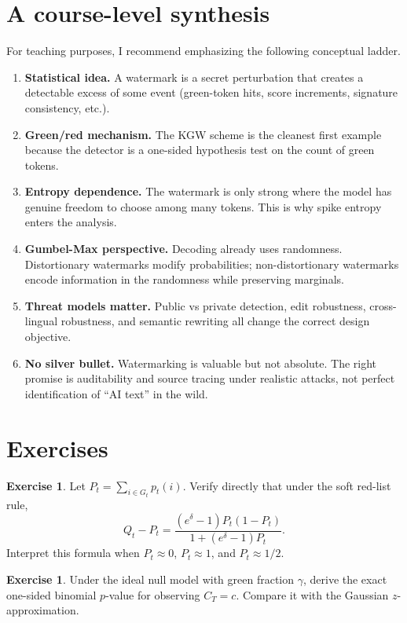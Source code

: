 \documentclass[11pt]{article}
\theoremstyle{definition}
\newtheorem{exercise}[theorem]{Exercise}
\newcommand{\1}{\mathbf{1}}
\begin{document}
\section{A course-level synthesis}

For teaching purposes, I recommend emphasizing the following conceptual ladder.

\begin{enumerate}
    \item \textbf{Statistical idea.} A watermark is a secret perturbation that creates a detectable excess of some event (green-token hits, score increments, signature consistency, etc.).
    \item \textbf{Green/red mechanism.} The KGW scheme is the cleanest first example because the detector is a one-sided hypothesis test on the count of green tokens.
    \item \textbf{Entropy dependence.} The watermark is only strong where the model has genuine freedom to choose among many tokens. This is why spike entropy enters the analysis.
    \item \textbf{Gumbel-Max perspective.} Decoding already uses randomness. Distortionary watermarks modify probabilities; non-distortionary watermarks encode information in the randomness while preserving marginals.
    \item \textbf{Threat models matter.} Public vs private detection, edit robustness, cross-lingual robustness, and semantic rewriting all change the correct design objective.
    \item \textbf{No silver bullet.} Watermarking is valuable but not absolute. The right promise is auditability and source tracing under realistic attacks, not perfect identification of ``AI text'' in the wild.
\end{enumerate}

\section{Exercises}

\begin{exercise}
Let $P_t=\sum_{i\in G_t} p_t(i)$. Verify directly that under the soft red-list rule,
\[
Q_t-P_t = \frac{(e^{\delta}-1)P_t(1-P_t)}{1+(e^{\delta}-1)P_t}.
\]
Interpret this formula when $P_t\approx 0$, $P_t\approx 1$, and $P_t\approx 1/2$.
\end{exercise}

\begin{exercise}
Under the ideal null model with green fraction $\gamma$, derive the exact one-sided binomial $p$-value for observing $C_T=c$. Compare it with the Gaussian $z$-approximation.
\end{exercise}
\end{document}
